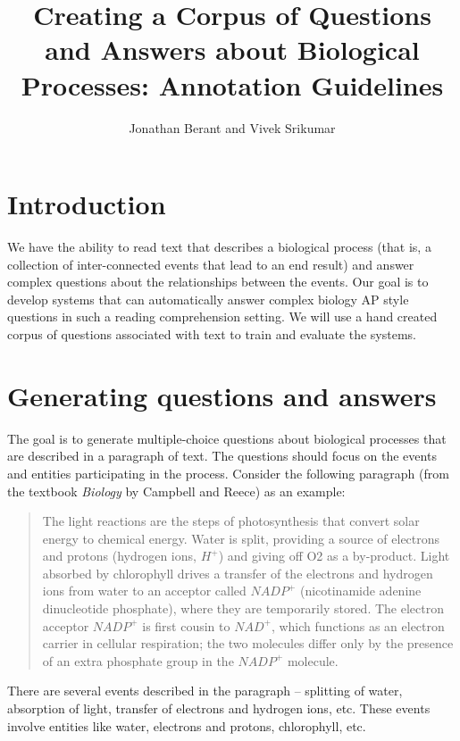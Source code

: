 \documentclass[11pt]{article}
\title{Creating a Corpus of Questions and Answers about Biological Processes: Annotation Guidelines}
\author{Jonathan Berant and Vivek Srikumar}
\date{}
\begin{document}
\maketitle



\section{Introduction}
\label{sec-1}

  
  We have the ability to read text that describes a biological process
  (that is, a collection of inter-connected events that lead to an end
  result) and answer complex questions about the relationships between
  the events. Our goal is to develop systems that can automatically
  answer complex biology AP style questions in such a reading
  comprehension setting. We will use a hand created corpus of
  questions associated with text to train and evaluate the systems.
\section{Generating questions and answers}
\label{sec-2}

  
  The goal is to generate multiple-choice questions about biological
  processes that are described in a paragraph of text. The questions
  should focus on the events and entities participating in the
  process. Consider the following paragraph (from the textbook
  \emph{Biology} by Campbell and Reece) as an example:

\begin{quote}
The light reactions are the steps of photosynthesis that convert solar
energy to chemical energy. Water is split, providing a source of
electrons and protons (hydrogen ions, $H^+$) and giving off O2 as a
by-product. Light absorbed by chlorophyll drives a transfer of the
electrons and hydrogen ions from water to an acceptor called $NADP^+$
(nicotinamide adenine dinucleotide phosphate), where they are
temporarily stored. The electron acceptor $NADP^+$ is first cousin to
$NAD^+$, which functions as an electron carrier in cellular
respiration; the two molecules differ only by the presence of an extra
phosphate group in the $NADP^+$ molecule.
\end{quote}

  There are several events described in the paragraph -- splitting of
  water, absorption of light, transfer of electrons and hydrogen ions,
  etc. These events involve entities like water, electrons and
  protons, chlorophyll, etc. 
\end{document}
